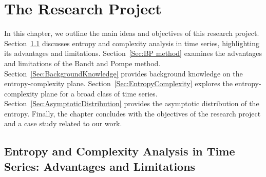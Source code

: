 \chapter{The Research Project}\label{C:aim}

In this chapter, we outline the main ideas and objectives of this research project. 
Section~\ref{Sec:AdvantagesLimitations} discusses entropy and complexity analysis in time series, highlighting its advantages and limitations. 
Section~\ref{Sec:BP method} examines the advantages and  limitations of the Bandt and Pompe method. 
Section~\ref{Sec:BackgroundKnowledge}  provides background knowledge on the 
entropy-complexity plane. 
Section~\ref{Sec:EntropyComplexity} explores the entropy-complexity plane for a broad class of time series. Section~\ref{Sec:AsymptoticDistribution} provides the asymptotic distribution of the entropy. Finally, the chapter concludes with the objectives of the research project and a case study related to our work.

\section{Entropy and Complexity Analysis in Time Series: Advantages and Limitations}\label{Sec:AdvantagesLimitations}

